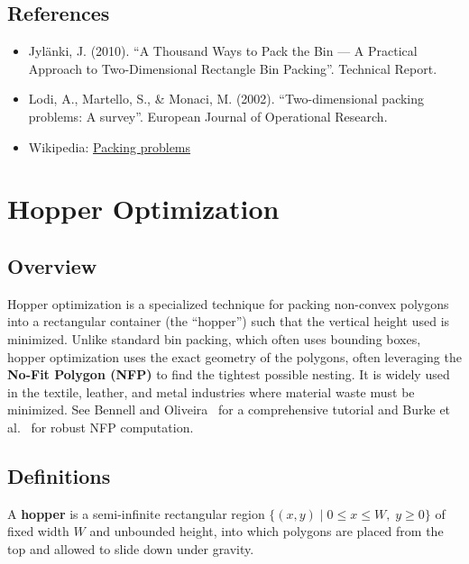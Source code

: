 \subsection{References}
\begin{itemize}
    \item Jyl\"anki, J. (2010). ``A Thousand Ways to Pack the Bin --- A Practical Approach to Two-Dimensional Rectangle Bin Packing''. Technical Report.
    \item Lodi, A., Martello, S., \& Monaci, M. (2002). ``Two-dimensional packing problems: A survey''. European Journal of Operational Research.
    \item Wikipedia: \href{https://en.wikipedia.org/wiki/Packing_problems}{Packing problems}
\end{itemize}

\section{Hopper Optimization}
\label{sec:hopper_optimization}

\subsection{Overview}
Hopper optimization is a specialized technique for packing non-convex polygons into a rectangular container (the ``hopper'') such that the vertical height used is minimized. Unlike standard bin packing, which often uses bounding boxes, hopper optimization uses the exact geometry of the polygons, often leveraging the \textbf{No-Fit Polygon (NFP)} to find the tightest possible nesting. It is widely used in the textile, leather, and metal industries where material waste must be minimized. See Bennell and Oliveira~\cite{bennell2008} for a comprehensive tutorial and Burke et al.~\cite{burke2007} for robust NFP computation.

\subsection{Definitions}

\begin{definition}[Hopper]\label{def:hopper}
A \textbf{hopper} is a semi-infinite rectangular region $\{(x,y) \mid 0 \leq x \leq W,\; y \geq 0\}$ of fixed width $W$ and unbounded height, into which polygons are placed from the top and allowed to slide down under gravity.
\end{definition}


